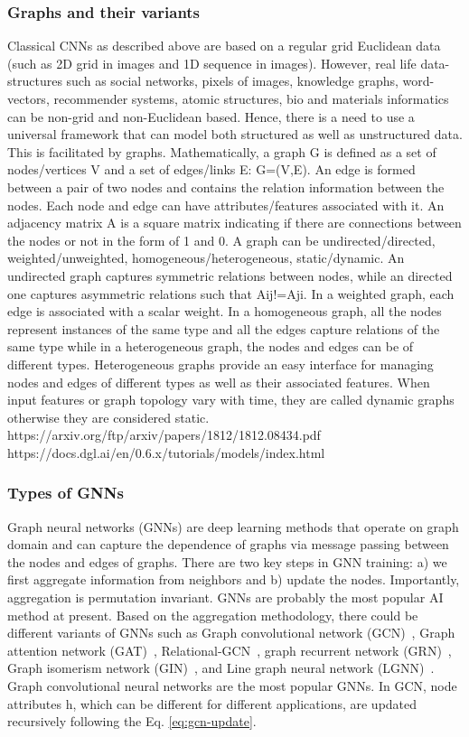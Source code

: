 \documentclass[pdflatex,sn-mathphys]{sn-jnl}%
\theoremstyle{thmstyleone}%
\theoremstyle{thmstyletwo}%
\theoremstyle{thmstylethree}%
\begin{document}
\subsubsection{Graphs and their variants}
Classical CNNs as described above are based on a regular grid Euclidean data (such as 2D grid in images and 1D sequence in images). However, real life data-structures such as social networks, pixels of images,  knowledge graphs, word-vectors, recommender systems, atomic structures, bio and materials informatics can be non-grid and non-Euclidean based. Hence, there is a need to use a universal framework that can model both structured as well as unstructured data. This is facilitated by graphs. 
Mathematically, a graph G is defined as a set of nodes/vertices V and a set of edges/links E: G=(V,E)\cite{west2001introduction,wang2019deep}. An edge is formed between a pair of two nodes and contains the relation information between the nodes. Each node and edge can have attributes/features associated with it. An adjacency matrix A is a square matrix  indicating if there are connections between the nodes or not in the form of 1 and 0. A graph can be undirected/directed, weighted/unweighted, homogeneous/heterogeneous, static/dynamic. An undirected graph captures symmetric relations between nodes, while an directed one captures asymmetric relations such that Aij!=Aji. In a weighted graph, each edge is associated with a scalar weight. In a homogeneous graph, all the nodes represent instances of the same type and all the edges capture relations of the same type while in a heterogeneous graph, the nodes and edges can be of different types. Heterogeneous graphs provide an easy interface for managing nodes and edges of different types as well as their associated features. When input features or graph topology vary with time, they are called dynamic graphs otherwise they are considered static.
https://arxiv.org/ftp/arxiv/papers/1812/1812.08434.pdf
https://docs.dgl.ai/en/0.6.x/tutorials/models/index.html


\subsubsection{Types of GNNs}

Graph neural networks (GNNs) are deep learning methods that operate on graph domain and can capture the dependence of graphs via message passing between the nodes and edges of graphs. There are two key steps in GNN training: a) we first aggregate information from neighbors and b) update the nodes. Importantly, aggregation is permutation invariant. GNNs are probably the most popular AI method at present. Based on the aggregation methodology, there could be different variants of GNNs such as Graph convolutional network (GCN)~\cite{kipf2016semi}, Graph attention network (GAT)~\cite{velivckovic2017graph}, Relational-GCN~\cite{?}, graph recurrent network (GRN)~\cite{?}, Graph isomerism network (GIN)~\cite{xu2018powerful}, and Line graph neural network (LGNN)~\cite{chen2017supervised}.
Graph convolutional neural networks are the most popular GNNs. In GCN, node attributes h, which can be different for different applications, are updated recursively following the Eq. \ref{eq:gcn-update}. 
\end{document}
